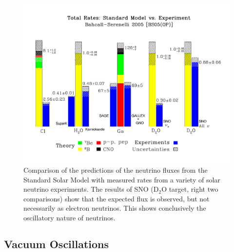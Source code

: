\begin{figure}
  \centering
  \includegraphics[width=16cm]{SolarNeutrinoFluxes.pdf}
  \caption{Comparison of the predictions of the neutrino fluxes from the Standard Solar Model with measured rates from a variety of solar neutrino experiments.  The results of SNO (D$_2$O target, right two comparisons) show that the expected flux is observed, but not necessarily as electron neutrinos.  This shows conclusively the oscillatory nature of neutrinos.}
  \label{fig:SolarNeutrinoFluxes}
\end{figure}

\subsection{Vacuum Oscillations}\label{sec:VacuumOscillations}

